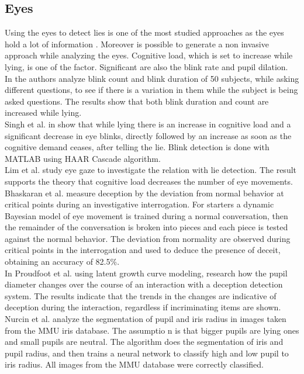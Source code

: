 \documentclass[LaM,binding=0.6cm,english,noexaminfo]{sapthesis}
\begin{document}
\subsection*{Eyes}
Using the eyes to detect lies is one of the most studied approaches as the eyes hold a lot of information \cite{FUKUDA2001239}. Moreover is possible to generate a non invasive approach while analyzing the eyes. Cognitive load, which is set to increase while lying, is one of the factor. Significant are also the blink rate and pupil dilation.\\
In \cite{8125844} the authors analyze blink count and blink duration of 50 subjects, while asking different questions, to see if there is a variation in them while the subject is being asked questions. The results show that both blink duration and count are increased while lying.\\
Singh et al. in \cite{7324092} show that while lying there is an increase in cognitive load and a significant decrease in eye blinks, directly followed by an increase as soon as the cognitive demand ceases, after telling the lie. Blink detection is done with MATLAB using HAAR Cascade algorithm.\\
Lim et al. study eye gaze \cite{Lim:2013:LTE:2535948.2535954} to investigate the relation with lie detection. The result supports the theory that cognitive load decreases the number of eye movements.\\
Bhaskaran et al. measure deception by the deviation from normal behavior \cite{5771407} at critical points during an investigative interrogation. For starters a dynamic Bayesian model of eye movement is trained during a normal conversation, then the remainder of the conversation is broken into pieces and each piece is tested against the normal behavior. The deviation from normality are observed during critical points in the interrogation and used to deduce the presence of deceit, obtaining an accuracy of 82.5\%. \\
In \cite{7165946} Proudfoot et al. using latent growth curve modeling, research how the pupil diameter changes over the course of an interaction with a deception detection system. The results indicate that the trends in the changes are indicative of deception during the interaction, regardless if incriminating items are shown. \\
Nurcin et al. \cite{NURCIN2017417} analyze the segmentation of pupil and iris radius in images taken from the MMU iris database. The assumptio n is that bigger pupils are lying ones and small pupils are neutral. The algorithm does the segmentation of iris and pupil radius, and then trains a neural network to classify high and low pupil to iris radius. All images from the MMU database were correctly classified.
\end{document}
